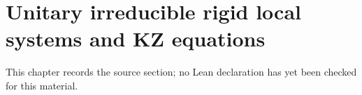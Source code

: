 \chapter{Unitary irreducible rigid local systems and KZ equations}
\label{rigid-local-systems-multiplicative-eigenvalue-problem-chapter-07}

\begin{remark}
\label{rigid-local-systems-multiplicative-eigenvalue-problem-chapter-07-source}
This chapter records the source section; no Lean declaration has yet been checked for this material.
\notready
\end{remark}

\label{EqKZ}
